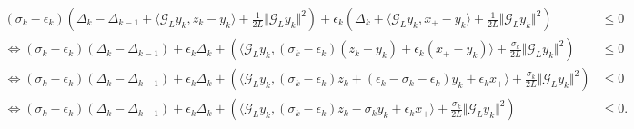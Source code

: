 \documentclass[12pt]{article}
\begin{document}
        {\footnotesize
        \begin{align*}
            (\sigma_k - \epsilon_k)
            \left(
                \Delta_k - \Delta_{k - 1}
                + \langle \mathcal G_L y_k, z_k - y_k\rangle
                + \frac{1}{2L} \Vert \mathcal G_L y_k \Vert^2
            \right)
            + 
            \epsilon_k 
            \left(
                \Delta_k + \langle \mathcal G_L y_k, x_+ - y_k\rangle + \frac{1}{2L}\Vert \mathcal G_L y_k\Vert^2
            \right)
            &\le 
            0
            \\
            \iff
            (\sigma_k - \epsilon_k)(\Delta_k - \Delta_{k - 1}) 
            + \epsilon_k \Delta_k 
            + 
            \left(
                \langle \mathcal G_L y_k, 
                    (\sigma_k - \epsilon_k)(z_k - y_k)
                    + 
                    \epsilon_k (x_+ - y_k)
                \rangle
                + 
                \frac{\sigma_k}{2L}\Vert \mathcal G_Ly_k\Vert^2
            \right) 
            &\le 0
            \\
            \iff
            (\sigma_k - \epsilon_k)(\Delta_k - \Delta_{k - 1}) 
            + \epsilon_k \Delta_k 
            + 
            \left(
                \langle \mathcal 
                    G_L y_k, 
                    (\sigma_k - \epsilon_k)z_k + 
                    (\epsilon_k - \sigma_k - \epsilon_k)y_k
                    + 
                    \epsilon_k x_+
                \rangle
                + 
                \frac{\sigma_k}{2L}\Vert \mathcal G_Ly_k\Vert^2
            \right) 
            &\le 0
            \\
            \iff
            (\sigma_k - \epsilon_k)(\Delta_k - \Delta_{k - 1}) 
            + \epsilon_k \Delta_k 
            + 
            \left(
                \langle \mathcal 
                    G_L y_k, 
                    (\sigma_k - \epsilon_k)z_k - \sigma_k y_k + \epsilon_k x_+
                \rangle
                + 
                \frac{\sigma_k}{2L}\Vert \mathcal G_Ly_k\Vert^2
            \right) 
            &\le 0. 
        \end{align*}
        }

    
\end{document}

